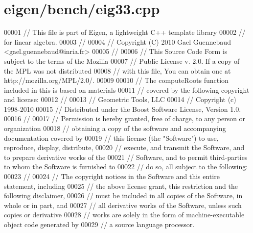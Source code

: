 \hypertarget{eigen_2bench_2eig33_8cpp_source}{}\section{eigen/bench/eig33.cpp}
\label{eigen_2bench_2eig33_8cpp_source}

\begin{DoxyCode}
00001 \textcolor{comment}{// This file is part of Eigen, a lightweight C++ template library}
00002 \textcolor{comment}{// for linear algebra.}
00003 \textcolor{comment}{//}
00004 \textcolor{comment}{// Copyright (C) 2010 Gael Guennebaud <gael.guennebaud@inria.fr>}
00005 \textcolor{comment}{//}
00006 \textcolor{comment}{// This Source Code Form is subject to the terms of the Mozilla}
00007 \textcolor{comment}{// Public License v. 2.0. If a copy of the MPL was not distributed}
00008 \textcolor{comment}{// with this file, You can obtain one at http://mozilla.org/MPL/2.0/.}
00009 
00010 \textcolor{comment}{// The computeRoots function included in this is based on materials}
00011 \textcolor{comment}{// covered by the following copyright and license:}
00012 \textcolor{comment}{// }
00013 \textcolor{comment}{// Geometric Tools, LLC}
00014 \textcolor{comment}{// Copyright (c) 1998-2010}
00015 \textcolor{comment}{// Distributed under the Boost Software License, Version 1.0.}
00016 \textcolor{comment}{// }
00017 \textcolor{comment}{// Permission is hereby granted, free of charge, to any person or organization}
00018 \textcolor{comment}{// obtaining a copy of the software and accompanying documentation covered by}
00019 \textcolor{comment}{// this license (the "Software") to use, reproduce, display, distribute,}
00020 \textcolor{comment}{// execute, and transmit the Software, and to prepare derivative works of the}
00021 \textcolor{comment}{// Software, and to permit third-parties to whom the Software is furnished to}
00022 \textcolor{comment}{// do so, all subject to the following:}
00023 \textcolor{comment}{// }
00024 \textcolor{comment}{// The copyright notices in the Software and this entire statement, including}
00025 \textcolor{comment}{// the above license grant, this restriction and the following disclaimer,}
00026 \textcolor{comment}{// must be included in all copies of the Software, in whole or in part, and}
00027 \textcolor{comment}{// all derivative works of the Software, unless such copies or derivative}
00028 \textcolor{comment}{// works are solely in the form of machine-executable object code generated by}
00029 \textcolor{comment}{// a source language processor.}

\end{DoxyCode}
